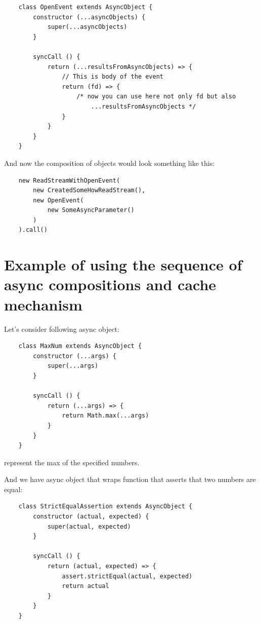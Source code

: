 \documentclass{article}
\begin{document}
\begin{verbatim}
    class OpenEvent extends AsyncObject {
        constructor (...asyncObjects) {
            super(...asyncObjects)
        }

        syncCall () {
            return (...resultsFromAsyncObjects) => {
                // This is body of the event
                return (fd) => {
                    /* now you can use here not only fd but also
                        ...resultsFromAsyncObjects */
                }
            }
        }
    }
\end{verbatim}

And now the composition of objects would look something like this:

\begin{verbatim}
    new ReadStreamWithOpenEvent(
        new CreatedSomeHowReadStream(),
        new OpenEvent(
            new SomeAsyncParameter()
        )
    ).call()
\end{verbatim}

\section{Example of using the sequence of async compositions and cache mechanism}

Let's consider following async object:

\begin{verbatim}
    class MaxNum extends AsyncObject {
        constructor (...args) {
            super(...args)
        }

        syncCall () {
            return (...args) => {
                return Math.max(...args)
            }
        }
    }
\end{verbatim}

 represent the max of the specified numbers.

And we have async object that wraps  function that asserts that two numbers are equal:

\begin{verbatim}
    class StrictEqualAssertion extends AsyncObject {
        constructor (actual, expected) {
            super(actual, expected)
        }

        syncCall () {
            return (actual, expected) => {
                assert.strictEqual(actual, expected)
                return actual
            }
        }
    }
\end{verbatim}
\end{document}
